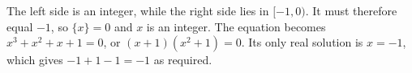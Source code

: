 The left side is an integer, while the right side lies in $[-1,0)$. It must therefore equal $-1$, so $\{x\}=0$ and $x$ is an integer. The equation becomes $x^3+x^2+x+1=0$, or $(x+1)(x^2+1)=0$. Its only real solution is $\boxed{x=-1}$, which gives $-1+1-1=-1$ as required.
